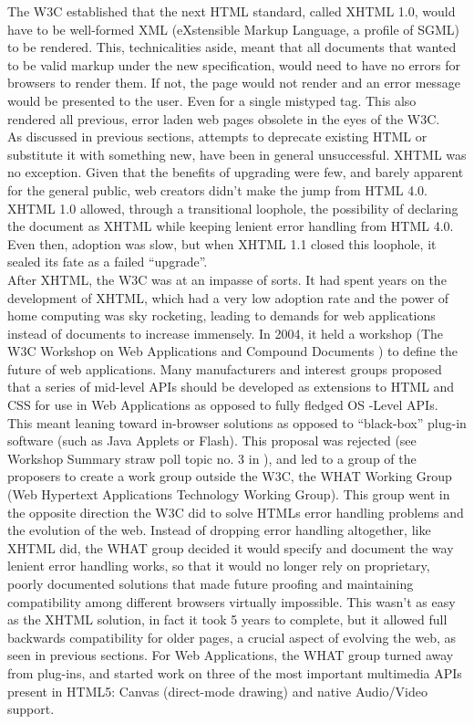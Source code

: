 The W3C established that the next HTML standard, called XHTML 1.0, would have to be well-formed XML (eXstensible Markup
Language, a profile of SGML) to be rendered. This, technicalities aside, meant that all documents that wanted to be valid
markup under the new specification, would need to have no errors for browsers to render them. If not, the page would not
render and an error message would be presented to the user. Even for a single mistyped tag. This also rendered all
previous, error laden web pages obsolete in the eyes of the W3C.\\

As discussed in previous sections, attempts to deprecate existing HTML or substitute it with something new, have been in
general unsuccessful. XHTML was no exception. Given that the benefits of upgrading were few, and barely apparent for the
general public, web creators didn't make the jump from HTML 4.0. XHTML 1.0 allowed, through a transitional loophole, the
possibility of declaring the document as XHTML while keeping lenient error handling from HTML 4.0. Even then, adoption was
slow, but when XHTML 1.1 closed this loophole, it sealed its fate as a failed ``upgrade''.\\

After XHTML, the W3C was at an impasse of sorts. It had spent years on the development of XHTML, which had a very low
adoption rate and the power of home computing was sky rocketing, leading to demands for web applications instead of
documents to increase immensely. In 2004, it held a workshop (The W3C Workshop on Web Applications and Compound Documents
\cite{w3c04}) to define the future of web applications. Many manufacturers and interest groups proposed that a series of
mid-level APIs should be developed as extensions to HTML and CSS for use in Web Applications as opposed to fully fledged OS
-Level APIs. This meant leaning toward in-browser solutions as opposed to ``black-box'' plug-in software (such as Java
Applets or Flash). This proposal was rejected (see Workshop Summary straw poll topic no. 3 in \cite{w3c04}), and led to a
group of the proposers to create a work group outside the W3C, the WHAT Working Group (Web Hypertext Applications
Technology Working Group). This group went in the opposite direction the W3C did to solve HTMLs error handling problems
and the evolution of the web. Instead of dropping error handling altogether, like XHTML did, the WHAT group decided it
would specify and document the way lenient error handling works, so that it would no longer rely on proprietary, poorly
documented solutions that made future proofing and maintaining compatibility among different browsers virtually
impossible. This wasn't as easy as the XHTML solution, in fact it took 5 years to complete, but it allowed full backwards
compatibility for older pages, a crucial aspect of evolving the web, as seen in previous sections. For Web Applications,
the WHAT group turned away from plug-ins, and started work on three of the most important multimedia APIs present in
HTML5: Canvas (direct-mode drawing) and native Audio/Video support.\\

